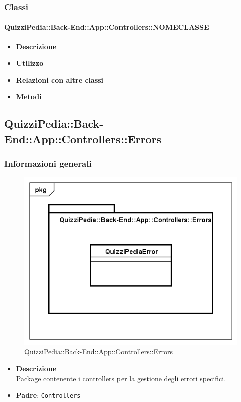 \subsubsection{Classi}
\paragraph{QuizziPedia::Back-End::App::Controllers::NOMECLASSE}
	\begin{itemize}
		\item \textbf{Descrizione} \\
		\item \textbf{Utilizzo} \\
		\item \textbf{Relazioni con altre classi} \\
		\item \textbf{Metodi} \\
	\end{itemize}
	
\subsection{QuizziPedia::Back-End::App::Controllers::Errors}
\subsubsection{Informazioni generali}
\label{QuizziPedia::Back-End::App::Controllers::Errors}
\begin{figure}
	\centering
	\includegraphics[scale=0.45]{UML/Package/QuizziPedia_Back-End_App_Controllers_Errors.png}
	\caption{QuizziPedia::Back-End::App::Controllers::Errors}
\end{figure}
	\begin{itemize}
		\item \textbf{Descrizione} \\
		Package contenente i controllers per la gestione degli errori specifici.
		\item \textbf{Padre}: \texttt{Controllers}
	\end{itemize}
